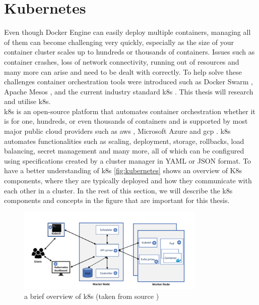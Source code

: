 \section{Kubernetes}\label{sec:kubernetes}

Even though Docker Engine can easily deploy multiple containers, managing all of them can become challenging very quickly, especially as the size of your container cluster scales up to hundreds or thousands of containers. Issues such as container crashes, loss of network connectivity, running out of resources and many more can arise and need to be dealt with correctly. To help solve these challenges container orchestration tools were introduced such as Docker Swarm \cite{dockerswarm}, Apache Mesos \cite{apachemesos}, and the current industry standard \acrshort{k8s} \cite{resman} \cite{CNCFSurvey}. This thesis will research and utilise \acrshort{k8s}.
\\[10pt]

\acrfull{k8s} is an open-source platform that automates container orchestration whether it is for one, hundreds, or even thousands of containers and is supported by most major public cloud providers such as \acrfull{aws} \cite{aws}, Microsoft Azure \cite{azure} and \acrfull{gcp} \cite{gcp}. \acrshort{k8s} automates functionalities such as scaling, deployment, storage, rollbacks, load balancing, secret management and many more, all of which can be configured using specifications created by a cluster manager in YAML or JSON format. To have a better understanding of \acrshort{k8s} \autoref{fig:kubernetes} shows an overview of K8s components, where they are typically deployed and how they communicate with each other in a cluster. In the rest of this section, we will describe the \acrshort{k8s} components and concepts in the figure that are important for this thesis. 
\\[10pt]
\begin{figure}[htbp]
  \centering
  \includegraphics[width=0.8\textwidth]{images/kubernetes-structure.png} 
  \caption{a brief overview of \acrshort{k8s} (taken from source \cite{IslamShamim2020a})}
  \label{fig:kubernetes}
\end{figure}

